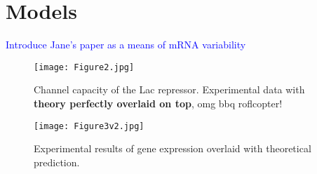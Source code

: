 \section{Models}

\textcolor{blue}{Introduce Jane's paper as a means of mRNA variability}


\begin{figure}[h!]
	\centering \texttt{[image: Figure2.jpg]} \caption{Channel capacity of the Lac repressor. Experimental data with \textbf{theory perfectly overlaid on top}, omg bbq roflcopter!}
	\label{figChannelCapacity}
\end{figure}

\begin{figure}[h!]
	\centering \texttt{[image: Figure3v2.jpg]} \caption{Experimental results of gene expression overlaid with theoretical prediction. }
	\label{figFullProfile}
\end{figure}

